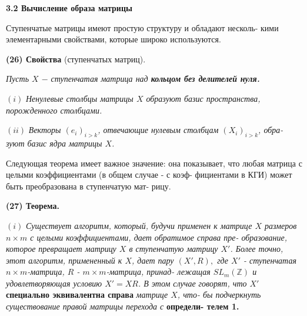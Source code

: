 \documentclass{mai_book}
\begin{document}
	\noindent
	{\large {\bf 3.2 Вычисление образа матрицы}}
	
	\noindent
	Ступенчатые матрицы имеют простую структуру и обладают несколь-\linebreak
	кими элементарными свойствами, которые широко используются.
	
	\noindent
	{\bf (26) Свойства} (ступенчатых матриц).
	
	{\it Пусть $X$ $-$ ступенчатая матрица над {\bf кольцом без делителей\linebreak
	нуля.}}

	$(i)$ {\it Ненулевые столбцы матрицы $X$ образуют базис пространства,\linebreak
	порожденного столбцами.}

	$(ii)$ {\it Векторы $(e_{i})_{i > k}$, отвечающие нулевым столбцам $(X_{i})_{i > k}$, обра-\linebreak
	зуют базис ядра матрицы $X$.}
	
	Следующая теорема имеет важное значение: она показывает, что\linebreak
	любая матрица с целыми коэффициентами (в общем случае - с коэф-\linebreak
	фициентами в КГИ) может быть преобразована в ступенчатую мат-\linebreak
	рицу.
	
	\pagebreak
	
	
	\noindent
	{\bf (27) Теорема.}
	
	$(i)$ {\it Существует алгоритм, который, будучи применен к матрице $X$\linebreak
	размеров $n\times m$ с целыми коэффициентами, дает обратимое справа пре-\linebreak
	образование, которое превращает матрицу $X$ в ступенчатую матрицу\linebreak
	$X'$. Более точно, этот алгоритм, примененный к $X$, дает пару $(X', R),$\linebreak
	где $X'$ - ступенчатая $n\times m$-матрица, $R$ - $m\times m$-матрица, принад-\linebreak
	лежащая $SL_{m}(\mathbb Z)$ и удовлетворяющая условию $X' = XR$. В этом случае\linebreak
	говорят, что $X'$} {\bf специально эквивалентна справа} {\it матрице $X$, \it что-\linebreak
	бы подчеркнуть существование правой матрицы перехода с} {\bf определи-\linebreak
	телем 1.}
	
\end{document}
